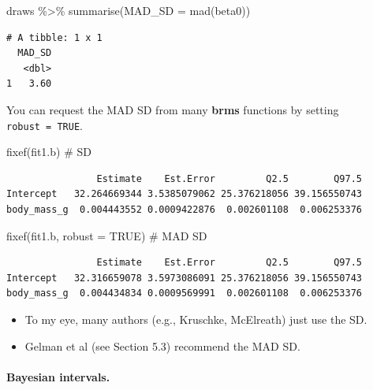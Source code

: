 \documentclass[
  letterpaper,
  DIV=11,
  numbers=noendperiod]{scrartcl}
\let\oldparagraph\paragraph
\renewcommand{\paragraph}[1]{\oldparagraph{#1}\mbox{}}
\newenvironment{Shaded}{\begin{snugshade}}{\end{snugshade}}
\newcommand{\AttributeTok}[1]{\textcolor[rgb]{0.40,0.45,0.13}{#1}}
\newcommand{\CommentTok}[1]{\textcolor[rgb]{0.37,0.37,0.37}{#1}}
\newcommand{\ConstantTok}[1]{\textcolor[rgb]{0.56,0.35,0.01}{#1}}
\newcommand{\FunctionTok}[1]{\textcolor[rgb]{0.28,0.35,0.67}{#1}}
\newcommand{\NormalTok}[1]{\textcolor[rgb]{0.00,0.23,0.31}{#1}}
\newcommand{\SpecialCharTok}[1]{\textcolor[rgb]{0.37,0.37,0.37}{#1}}
\providecommand{\tightlist}{%
  \setlength{\itemsep}{0pt}\setlength{\parskip}{0pt}}\usepackage{longtable,booktabs,array}
\begin{document}
\begin{Shaded}
\begin{Highlighting}[]
\NormalTok{draws }\SpecialCharTok{\%\textgreater{}\%} 
  \FunctionTok{summarise}\NormalTok{(}\AttributeTok{MAD\_SD =} \FunctionTok{mad}\NormalTok{(beta0))}
\end{Highlighting}
\end{Shaded}

\begin{verbatim}
# A tibble: 1 x 1
  MAD_SD
   <dbl>
1   3.60
\end{verbatim}

You can request the MAD SD from many \textbf{brms} functions by setting
\texttt{robust\ =\ TRUE}.

\begin{Shaded}
\begin{Highlighting}[]
\FunctionTok{fixef}\NormalTok{(fit1.b)                 }\CommentTok{\# SD}
\end{Highlighting}
\end{Shaded}

\begin{verbatim}
                Estimate    Est.Error         Q2.5        Q97.5
Intercept   32.264669344 3.5385079062 25.376218056 39.156550743
body_mass_g  0.004443552 0.0009422876  0.002601108  0.006253376
\end{verbatim}

\begin{Shaded}
\begin{Highlighting}[]
\FunctionTok{fixef}\NormalTok{(fit1.b, }\AttributeTok{robust =} \ConstantTok{TRUE}\NormalTok{)  }\CommentTok{\# MAD SD}
\end{Highlighting}
\end{Shaded}

\begin{verbatim}
                Estimate    Est.Error         Q2.5        Q97.5
Intercept   32.316659078 3.5973086091 25.376218056 39.156550743
body_mass_g  0.004434834 0.0009569991  0.002601108  0.006253376
\end{verbatim}

\begin{itemize}
\tightlist
\item
  To my eye, many authors (e.g., Kruschke, McElreath) just use the SD.
\item
  Gelman et al (see Section 5.3) recommend the MAD SD.
\end{itemize}

\paragraph{Bayesian intervals.}\label{bayesian-intervals.}
\end{document}
